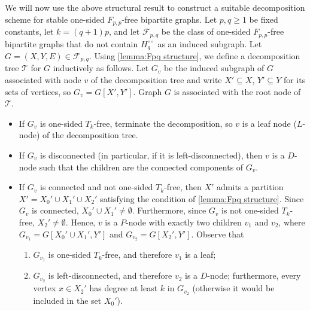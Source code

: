 \documentclass{theoretics}
\newcommand{\cF}{\ensuremath{\mathcal{F}}}
\newcommand{\cT}{\ensuremath{\mathcal{T}}}
\begin{document}
We will now use the above structural result to construct a suitable decomposition
scheme for stable one-sided $F_{p,p}$-free bipartite graphs.
Let $p,q \geq 1$ be fixed constants, let $k = (q+1)p$, and let $\cF_{p,q}$ 
be the class of one-sided $F_{p,p}$-free bipartite graphs that do not contain $H^{\circ\circ}_q$
as an induced subgraph. 
Let $G=(X,Y,E) \in \cF_{p,q}$.
Using \cref{lemma:Fpq structure}, we define a decomposition tree $\cT$ for $G$ inductively as follows. 
Let $G_v$ be the induced subgraph of $G$ associated with node $v$ of the decomposition tree and write $X' \subseteq X$, $Y' \subseteq Y$ for its sets of vertices, so $G_v = G[X',Y']$.
Graph $G$ is associated with the root node of $\cT$.
\begin{itemize}
	\item If $G_v$ is one-sided $T_k$-free, terminate the decomposition, so $v$ is a leaf node ($L$-node) of the decomposition tree.
	\item If $G_v$ is disconnected (in particular, if it is left-disconnected), then $v$ is a $D$-node such
	that the children are the connected components of $G_v$.
	\item If $G_v$ is connected and not one-sided $T_k$-free, then $X'$ admits a partition 
	$X' = X_0' \cup X_1' \cup X_2'$ satisfying the condition of \cref{lemma:Fpq structure}.
	Since $G_v$ is connected, $X_0' \cup X_1' \neq \emptyset$. Furthermore, since 
	$G_v$ is not one-sided $T_k$-free, $X_2' \neq \emptyset$. Hence, $v$ is a $P$-node
	with exactly two children $v_1$ and $v_2$, where $G_{v_1} = G[X_0' \cup X_1', Y']$ and 
	$G_{v_2} = G[X_2', Y']$. Observe that 
	\begin{enumerate}
		\item[(1)] $G_{v_1}$ is one-sided $T_k$-free, and therefore $v_1$ is a leaf;
		\item[(2)] $G_{v_2}$ is left-disconnected, and therefore $v_2$ is a $D$-node; furthermore, every vertex $x \in X_2'$ has degree at least $k$ in $G_{v_2}$ (otherwise it would be included in the set $X_0'$).
	\end{enumerate}
\end{itemize}
\end{document}
